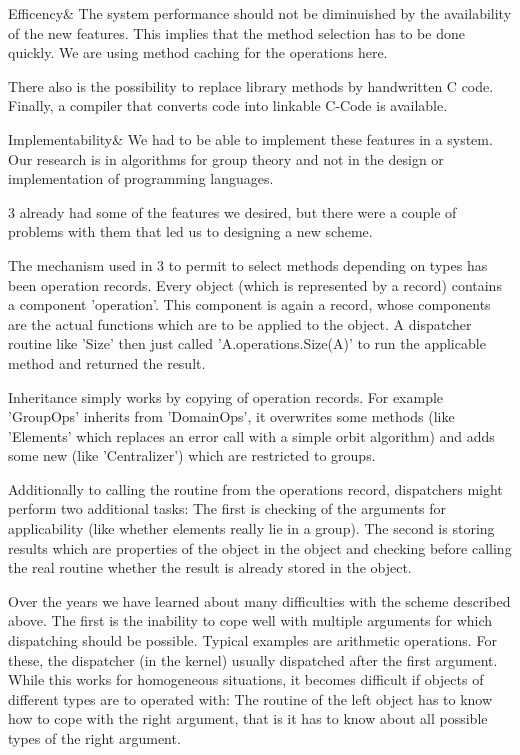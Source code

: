 Efficency&
The system performance should not be diminuished by the availability of the
new features. This implies that the method selection has to be done quickly.
We are using method caching for the operations here.

There also is the possibility to replace library methods by handwritten C
code. Finally, a compiler that converts {\GAP} code into linkable C-Code is
available.

Implementability&
We had to be able to implement these features in a system. Our
research is in algorithms for group theory and not in the design or
implementation of programming languages.

\enditems


{\GAP} 3 already had some of the features we desired, but there were a
couple of problems with them that led us to designing a new scheme.

The mechanism used in {\GAP} 3 to permit to select methods depending on
types has been operation records. Every object (which
is represented by a record) contains a component 'operation'. This
component is again a record, whose components are the actual functions which
are to be applied to the object. A dispatcher routine like 'Size' then
just called 'A.operations.Size(A)' to run the applicable method and
returned the result.

Inheritance simply works by copying of operation records. For example
'GroupOps' inherits from 'DomainOps', it overwrites some methods
(like 'Elements' which replaces an error call with a simple orbit
algorithm) and adds some new (like 'Centralizer') which are restricted
to groups.\par
Additionally to calling the routine from the operations record, dispatchers
might perform two additional tasks: The first is checking of the arguments
for applicability (like whether elements really lie in a group). The second
is storing results which are properties of the object in the object and
checking before calling the real routine whether the result is already
stored in the object.

Over the years we have learned about many difficulties with the scheme
described above. The first is the inability to cope well with multiple
arguments for which dispatching should be possible. Typical examples are
arithmetic operations. For these, the dispatcher (in the kernel) usually
dispatched after the first argument. While this works for homogeneous
situations, it becomes difficult if objects of different types are to
operated with: The routine of the left object has to know how to cope with
the right argument, that is it has to know about all possible types of the
right argument.

